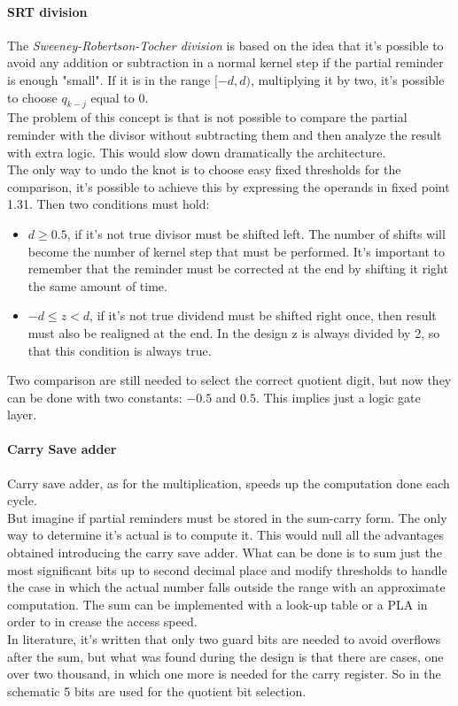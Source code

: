 \paragraph{SRT division}
The \textit{Sweeney-Robertson-Tocher division} is based on the idea that it's possible to avoid any addition or subtraction in a normal kernel step if the partial reminder is enough "small". If it is in the range $[-d,d)$, multiplying it by two, it's possible to choose $q_{k-j}$ equal to 0.\\
The problem of this concept is that is not possible to compare the partial reminder with the divisor without subtracting them and then analyze the result with extra logic. This would slow down dramatically the architecture.\\ The only way to undo the knot is to choose easy fixed thresholds for the comparison, it's possible to achieve this by expressing the operands in fixed point 1.31. Then two conditions must hold:
\begin{itemize}
    \item $d \geq 0.5$, if it's not true divisor must be shifted left. The number of shifts will become the number of kernel step that must be performed. It's important to remember that the reminder must be corrected at the end by shifting it right the same amount of time.
    \item $-d \leq z < d$, if it's not true dividend must be shifted right once, then result must also be realigned at the end. In the design z is always divided by 2, so that this condition is always true.
\end{itemize}
Two comparison are still needed to select the correct quotient digit, but now they can be done with two constants: $-0.5$ and $0.5$. This implies just a logic gate layer.\\
\paragraph{Carry Save adder}
Carry save adder, as for the multiplication, speeds up the computation done each cycle.\\
But imagine if partial reminders must be stored in the sum-carry form. The only way to determine it's actual is to compute it. This would null all the advantages obtained introducing the carry save adder. What can be done is to sum just the most significant bits up to second decimal place and modify thresholds to handle the case in which the actual number falls outside the range with an approximate computation. The sum can be implemented with a look-up table or a PLA in order to in crease the access speed.\\
In literature, it's written that only two guard bits are needed to avoid overflows after the sum, but what was found during the design is that there are cases, one over two thousand, in which one more is needed for the carry register. So in the schematic 5 bits are used for the quotient bit selection.


